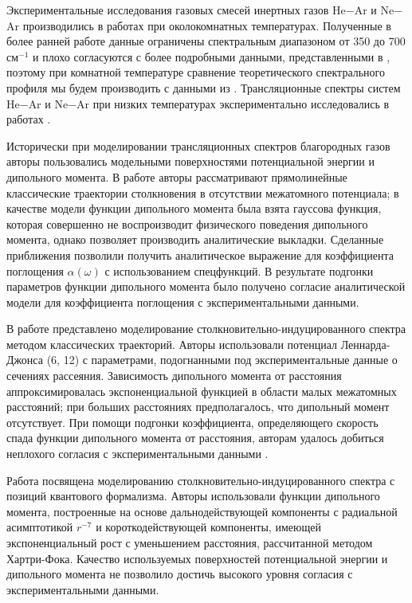 Экспериментальные исследования газовых смесей инертных газов He$-$Ar и Ne$-$Ar производились в работах \cite{bosomworth1965_part1, bosomworth1965_part2} при околокомнатных температурах. Полученные в более ранней работе \cite{kiss1959} данные ограничены спектральным диапазоном от 350 до 700 см$^{-1}$ и плохо согласуются с более подробными данными, представленными в \cite{bosomworth1965_part2}, поэтому при комнатной температуре сравнение теоретического спектрального профиля мы будем производить с данными из \cite{bosomworth1965_part2}. Трансляционные спектры систем He$-$Ar и Ne$-$Ar при низких температурах экспериментально исследовались в работах \cite{bukhtoyarova1977, bukhtoyarova1977_2, ryzhov1974}. \par 
Исторически при моделировании трансляционных спектров благородных газов авторы пользовались модельными поверхностями потенциальной энергии и дипольного момента. В работе \cite{levine1967} авторы рассматривают прямолинейные классические траектории столкновения в отсутствии межатомного потенциала; в качестве модели функции дипольного момента была взята гауссова функция, которая совершенно не воспроизводит физического поведения дипольного момента, однако позволяет производить аналитические выкладки. Сделанные приближения позволили получить аналитическое выражение для коэффициента поглощения $\alpha(\omega)$ с использованием спецфункций. В результате подгонки параметров функции дипольного момента было получено согласие аналитической модели для коэффициента поглощения с экспериментальными данными. \par
В работе \cite{mcquarrie1968} представлено моделирование столкновительно-индуцированного спектра методом классических траекторий. Авторы использовали потенциал Леннарда-Джонса (6, 12) с параметрами, подогнанными под экспериментальные данные о сечениях рассеяния. Зависимость дипольного момента от расстояния аппроксимировалась экспоненциальной функцией в области малых межатомных расстояний; при больших расстояниях предполагалось, что дипольный момент отсутствует. При помощи подгонки коэффициента, определяющего скорость спада функции дипольного момента от расстояния, авторам удалось добиться неплохого согласия с экспериментальными данными \cite{bosomworth1965_part2}. \par
Работа \cite{sharma1975} посвящена моделированию столкновительно-индуцированного спектра с позиций квантового формализма. Авторы использовали функции дипольного момента, построенные на основе дальнодействующей компоненты с радиальной асимптотикой $r^{-7}$ и короткодействующей компоненты, имеющей экспоненциальный рост с уменьшением расстояния, рассчитанной методом Хартри-Фока. Качество используемых поверхностей потенциальной энергии и дипольного момента не позволило достичь высокого уровня согласия с экспериментальными данными. \par
